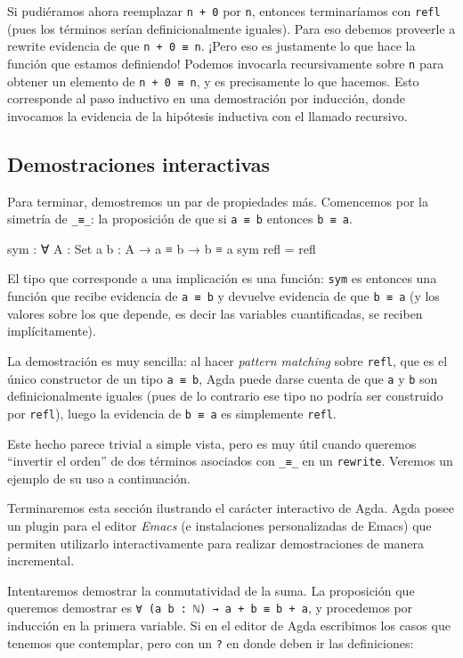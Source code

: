 \documentclass[11pt]{article} %
\begin{document}
Si pudiéramos ahora reemplazar \verb|n + 0| por \verb|n|, entonces terminaríamos con \verb|refl| (pues los términos serían definicionalmente iguales). Para eso debemos proveerle a rewrite evidencia de que \verb|n + 0 ≡ n|. ¡Pero eso es justamente lo que hace la función que estamos definiendo! Podemos invocarla recursivamente sobre \verb|n| para obtener un elemento de \verb|n + 0 ≡ n|, y es precisamente lo que hacemos. Esto corresponde al paso inductivo en una demostración por inducción, donde invocamos la evidencia de la hipótesis inductiva con el llamado recursivo.


\subsection{Demostraciones interactivas}
Para terminar, demostremos un par de propiedades más. Comencemos por la simetría de \verb|_≡_|: la proposición de que si \verb|a ≡ b| entonces \verb|b ≡ a|.

\begin{code}
sym : ∀ {A : Set} {a b : A} → a ≡ b → b ≡ a
sym refl = refl
\end{code}

El tipo que corresponde a una implicación es una función: \verb|sym| es entonces una función que recibe evidencia de \verb|a ≡ b| y devuelve evidencia de que \verb|b ≡ a| (y los valores sobre los que depende, es decir las variables cuantificadas, se reciben implícitamente).

La demostración es muy sencilla: al hacer \textit{pattern matching} sobre \verb|refl|, que es el único constructor de un tipo \verb|a ≡ b|, Agda puede darse cuenta de que \verb|a| y \verb|b| son definicionalmente iguales (pues de lo contrario ese tipo no podría ser construido por \verb|refl|), luego la evidencia de \verb|b ≡ a| es simplemente \verb|refl|. 

Este hecho parece trivial a simple vista, pero es muy útil cuando queremos ``invertir el orden'' de dos términos asociados con \verb|_≡_| en un \verb|rewrite|. Veremos un ejemplo de su uso a continuación.

Terminaremos esta sección ilustrando el carácter interactivo de Agda. Agda posee un plugin para el editor \textit{Emacs} (e instalaciones personalizadas de Emacs) que permiten utilizarlo interactivamente para realizar demostraciones de manera incremental.

Intentaremos demostrar la conmutatividad de la suma. La proposición que queremos demostrar es \verb|∀ (a b : ℕ) → a + b ≡ b + a|, y procedemos por inducción en la primera variable. Si en el editor de Agda escribimos los casos que tenemos que contemplar, pero con un \verb|?| en donde deben ir las definiciones:
\end{document}
